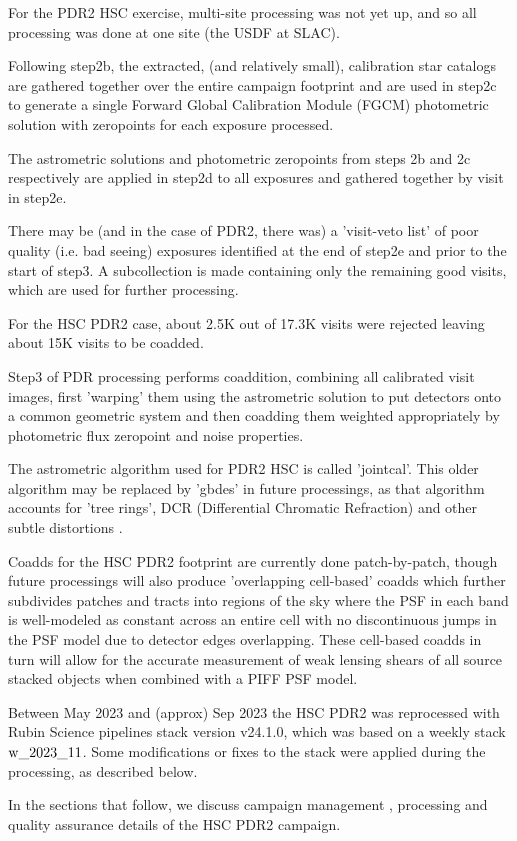 For the PDR2 HSC exercise, multi-site processing was not yet up, 
and so all processing was done at one site (the USDF at SLAC).

Following step2b, the extracted, (and relatively small),
calibration star catalogs are gathered together over the entire campaign
footprint and are used in step2c to generate a single Forward 
Global Calibration Module (FGCM) photometric solution with zeropoints for
each exposure processed.

The astrometric solutions and photometric zeropoints from steps 2b and 2c
respectively are applied in step2d to all exposures and gathered together 
by visit in step2e.

There may be (and in the case of PDR2, there was) a 'visit-veto list' of 
poor quality (i.e. bad seeing) exposures identified at the end of step2e and 
prior to the start of step3.  A subcollection is made containing only 
the remaining good visits, which are used for further processing.  

For the HSC PDR2 case, about 2.5K out of 17.3K visits were rejected 
leaving about 15K visits to be coadded.

Step3 of PDR processing performs coaddition, combining all calibrated 
visit images, first 'warping' them using the astrometric solution to put 
detectors onto a common geometric system and then coadding them weighted 
appropriately by photometric flux zeropoint and noise properties.

The astrometric algorithm used for PDR2 HSC is called 'jointcal'.  This
older algorithm may be replaced by 'gbdes' in future processings, as that
algorithm accounts for 'tree rings', DCR (Differential Chromatic 
Refraction) and other subtle distortions .

Coadds for the HSC PDR2 footprint are currently done patch-by-patch,
though future processings will also produce 'overlapping cell-based' 
coadds  which further subdivides patches and 
tracts into regions of the sky where the PSF in each band 
is well-modeled as constant across an entire cell with no 
discontinuous jumps in the PSF model due to detector edges overlapping.
These cell-based coadds in turn will allow for the accurate measurement of 
weak lensing shears of all source stacked objects when combined with
a PIFF PSF model.

Between May 2023 and (approx) Sep 2023 the HSC PDR2 was reprocessed with 
Rubin Science pipelines stack version v24.1.0, which was 
based on a weekly stack $\rm w\_2023\_11$.  Some modifications or fixes 
to the stack were applied during the processing, as described below.

In the sections that follow, we discuss campaign 
management , 
processing  and quality 
assurance  details of the HSC PDR2 campaign.


